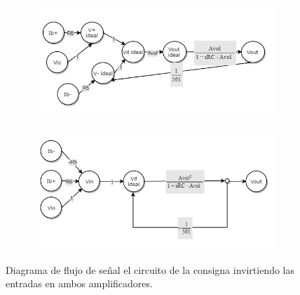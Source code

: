 \documentclass[../../main.tex]{subfiles}
\begin{document}
\begin{figure}[htpb]%
	\centering
	\begin{subfigure}[t]{0.49\textwidth}
		\centering
		\includegraphics[width=\textwidth]{imagenes/signal_flow_inv_ambos.png}
		\caption{}
		\label{fig:ej_3_signal_flow_inv_ambos_no_simplificado}
	\end{subfigure}%
	\hfill%
	\begin{subfigure}[t]{0.49\textwidth}
		\centering
		\includegraphics[width=\textwidth]{imagenes/signal_flow_inv_ambos_simplificado.png}
		\caption{}
		\label{fig:ej_3_signal_flow_inv_ambos_simplificado}
	\end{subfigure}
	\label{fig:ej_3_signal_flow_inv_ambos}	
	\caption{Diagrama de flujo de se\~nal el circuito de la consigna invirtiendo las entradas en ambos amplificadores.}
\end{figure}
\end{document}
